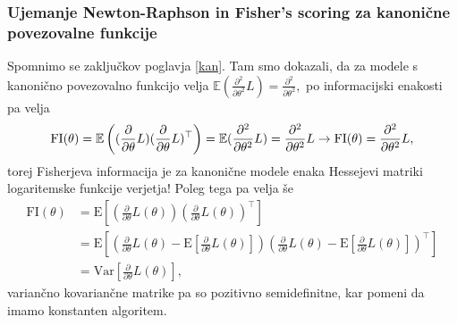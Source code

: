 \documentclass[12pt,a4paper]{amsart}
\theoremstyle{definition} %
\theoremstyle{plain} %
\begin{document}

\subsubsection{Ujemanje Newton-Raphson in Fisher's scoring za kanonične povezovalne funkcije}
Spomnimo se zaključkov poglavja \ref{kan}. Tam smo dokazali, da za modele s kanonično povezovalno funkcijo velja $\mathbb{E}(\frac{\partial^2}{\partial\theta^2}L) = \frac{\partial^2}{\partial\theta^2},$
po informacijski enakosti pa velja 
\begin{equation*}
    \mathrm{FI}(\theta) = \mathbb{E}\left((\frac{\partial}{\partial\theta} L)(\frac{\partial}{\partial\theta} L)^\top\right) = \mathbb{E}(\frac{\partial^2}{\partial\theta^2}L) = \frac{\partial^2}{\partial\theta^2}L \\
    \rightarrow \mathrm{FI}(\theta) = \frac{\partial^2}{\partial\theta^2}L,
\end{equation*}
torej Fisherjeva informacija je za kanonične modele enaka Hessejevi matriki logaritemske funkcije verjetja! Poleg tega pa velja še
\begin{align}
    \mathrm{FI}(\theta) &= \mathrm{E}[(\frac{\partial}{\partial\theta} L(\theta))(\frac{\partial}{\partial\theta} L(\theta))^\top] \nonumber\\
    &= \mathrm{E}[\left(\frac{\partial}{\partial\theta} L(\theta) - \mathrm{E}[\frac{\partial}{\partial\theta} L(\theta)]\right)\left(\frac{\partial}{\partial\theta} L(\theta) - \mathrm{E}[\frac{\partial}{\partial\theta} L(\theta)]\right)^\top] \nonumber \\
    &= \mathrm{Var}[\frac{\partial}{\partial\theta} L(\theta)],
\end{align}
variančno kovariančne matrike pa so pozitivno semidefinitne, kar pomeni da imamo konstanten algoritem.
\end{document}
